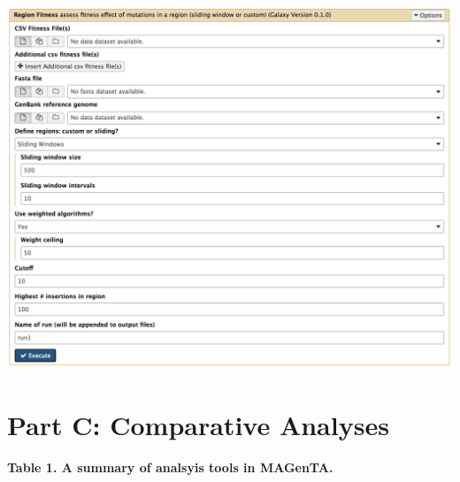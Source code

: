 \documentclass[11pt,]{article}
\begin{document}
\centerline{\includegraphics[width=0.8\linewidth]{figs/regionFitness_galaxy.png}}

\newpage

\section{Part C: Comparative
Analyses}\label{part-c-comparative-analyses}

\textbf{Table 1. A summary of analsyis tools in MAGenTA.}
\end{document}
